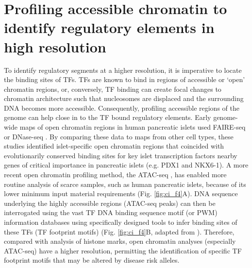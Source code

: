 \section{Profiling accessible chromatin to identify regulatory elements in high resolution}
To identify regulatory segments at a higher resolution, it is imperative to locate the binding sites of TFs. TFs are known to bind in regions of accessible or ‘open’ chromatin regions, or, conversely, TF binding can create focal changes to chromatin architecture such that nucleosomes are displaced and the surrounding DNA becomes more accessible. Consequently, profiling accessible regions of the genome can help close in to the TF bound regulatory elements. Early genome-wide maps of open chromatin regions in human pancreatic islets used \ac{FAIRE-seq} \cite{gaultonMapOpenChromatin2010} or \ac{DNase-seq} \cite{stitzelGlobalEpigenomicAnalysis2010}. By comparing these data to maps from other cell types, these studies identified islet-specific open chromatin regions that coincided with evolutionarily conserved binding sites for key islet transcription factors nearby genes of critical importance in pancreatic islets (e.g. PDX1 and NKX6-1). A more recent open chromatin profiling method, the \ac{ATAC-seq} \cite{buenrostroATACseqMethodAssaying2015}, has enabled more routine analysis of scarce samples, such as human pancreatic islets, because of its lower minimum input material requirements (Fig. \ref{fig:ci_f4}A). DNA sequence underlying the highly accessible regions (ATAC-seq peaks) can then be interrogated using the vast TF DNA binding sequence motif (or \ac{PWM}) information databases \cite{kheradpourSystematicDiscoveryCharacterization2014, mathelierJASPAR2014Extensively2014,sandelinJASPAROpenaccessDatabase2004,jolmaDNABindingSpecificitiesHuman2013} using specifically designed tools \cite{pique-regiAccurateInferenceTranscription2011} to infer binding sites of these TFs (TF footprint motifs) (Fig. \ref{fig:ci_f4}B, adapted from \cite{kyonoGenomicAnnotationDiseaseassociated2019}). Therefore, compared with analysis of histone marks, open chromatin analyses (especially ATAC-seq) have a higher resolution, permitting the identification of specific TF footprint motifs that may be altered by disease risk alleles. 



